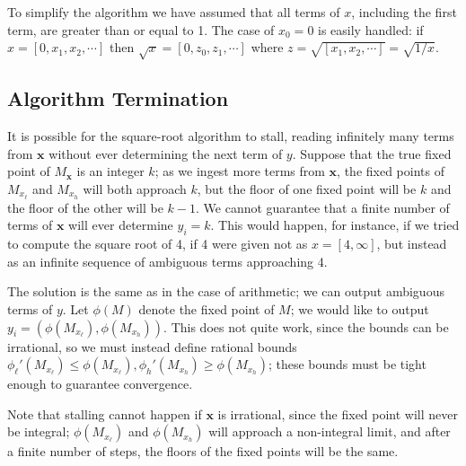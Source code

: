 \documentclass[11pt, oneside]{amsart}   	%
\begin{document}
To simplify the algorithm we have assumed that all terms of $x$, including the first term, are greater than or equal to 1. The case of $x_0=0$ is easily handled: if $x = [0,x_1,x_2,\cdots]$ then $\sqrt{x} = [0,z_0,z_1,\cdots]$ where $z = \sqrt{[x_1,x_2,\cdots]} = \sqrt{1/x}$.


\subsection{Algorithm Termination}
It is possible for the square-root algorithm to stall, reading infinitely many terms from $\mathbf{x}$ without ever determining the next term of $y$.
Suppose that the true fixed point of $M_\mathbf{x}$ is an integer $k$; as we ingest more terms from $\mathbf{x}$, the fixed points of $M_{x_\ell}$ and $M_{x_h}$ will both approach  $k$, but the floor of one fixed point will be $k$ and the floor of the other will be $k-1$.
We cannot guarantee that a finite number of terms of $\mathbf{x}$ will ever determine $y_i=k$.
This would happen, for instance, if we tried to compute the square root of 4, if 4 were given not as $x=[4,\infty]$, but instead as an infinite sequence of ambiguous terms approaching 4.

The solution is the same as in the case of arithmetic; we can output ambiguous terms of $y$. Let $\phi(M)$ denote the fixed point of $M$; we would like to output $y_i = (\phi(M_{x_\ell}), \phi(M_{x_h}))$. This does not quite work, since the bounds can be irrational, so we must instead define rational bounds ${\phi_\ell}'(M_{x_\ell}) \leq \phi(M_{x_\ell}), {\phi_h}'(M_{x_h}) \geq \phi(M_{x_h})$;  these bounds must be tight enough to guarantee convergence.

Note that stalling cannot happen if $\mathbf{x}$ is irrational, since the fixed point will never be integral; $\phi(M_{x_\ell})$ and $\phi(M_{x_h})$ will approach a non-integral limit, and after a finite number of steps, the floors of the fixed points will be the same.
\end{document}
